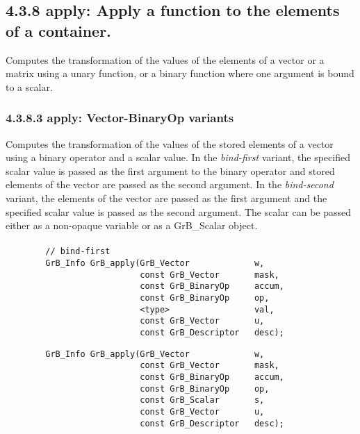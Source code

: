 \subsection*{4.3.8 {\sf apply}: Apply a function to the elements of a container.}

Computes the transformation of the values of the elements of a vector or a matrix 
using a unary function, or a binary function where one argument is bound to a scalar.


\subsubsection*{4.3.8.3 {\sf apply}: Vector-BinaryOp variants}

Computes the transformation of the values of the stored elements of a vector
using a binary operator and a scalar value. In the {\em bind-first} variant, the 
specified scalar value is passed as the first argument to the binary operator and
stored elements of the vector are passed as the second argument.  In the {\em
bind-second} variant, the elements of the vector are passed as the first 
argument and the specified scalar value is passed as the second argument.
{\color{red}
The scalar can be passed either as a non-opaque variable or as
a {\sf GrB\_Scalar} object.
}

\paragraph{\syntax}

\begin{verbatim}
        // bind-first
        GrB_Info GrB_apply(GrB_Vector             w,
                           const GrB_Vector       mask,
                           const GrB_BinaryOp     accum,
                           const GrB_BinaryOp     op,
                           <type>                 val,
                           const GrB_Vector       u,
                           const GrB_Descriptor   desc);
\end{verbatim}

{\color{red}
\begin{verbatim}
        GrB_Info GrB_apply(GrB_Vector             w,
                           const GrB_Vector       mask,
                           const GrB_BinaryOp     accum,
                           const GrB_BinaryOp     op,
                           const GrB_Scalar       s,
                           const GrB_Vector       u,
                           const GrB_Descriptor   desc);
\end{verbatim}
}

